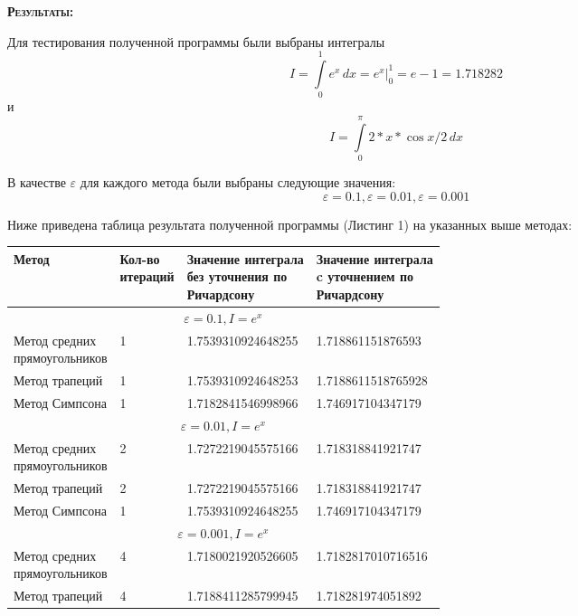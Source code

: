 \documentclass [12pt]{article}
\begin{document}
\textsc{\textbf{Результаты:}}

Для тестирования полученной программы были выбраны интегралы $$ I = \int\limits_0^1 e^x\,dx = e^x \bigg|_0^1 = e - 1 = 1.718282$$ и $$ I = \int\limits_0^\pi 2*x*\cos{x/2}\, dx$$

В качестве  $\varepsilon$ для каждого метода были выбраны следующие значения: $$\varepsilon=0.1,\varepsilon=0.01,\varepsilon=0.001$$

Ниже приведена таблица результата полученной программы (Листинг 1) на указанных выше методах:

\begin{center}
\begin{tabular}{ |l|l|l|l| }
  \hline
   Метод & \parbox[t]{2cm} {Кол-во \\ итераций} & \parbox[t]{4cm}{Значение интеграла \\ без уточнения по \\ Ричардсону} & \parbox[t]{4cm}{Значение интеграла \\ c уточнением по \\ Ричардсону} \\ \hline
   \\ \hline
  \parbox[t]{5cm} {Метод средних \\ прямоугольников } & 1 & 1.7539310924648255 & 1.718861151876593 \\ \hline
  Метод трапеций & 1 & 1.7539310924648253 & 1.7188611518765928 \\ \hline
  Метод Симпсона & 1 & 1.7182841546998966 & 1.746917104347179 \\ \hline
   \\ \hline
  \parbox[t]{5cm} {Метод средних \\ прямоугольников } & 2 & 1.7272219045575166 & 1.718318841921747 \\ \hline
  Метод трапеций & 2 & 1.7272219045575166 & 1.718318841921747 \\ \hline
  Метод Симпсона & 1 & 1.7539310924648255 & 1.746917104347179 \\ \hline
   \\ \hline
  \parbox[t]{5cm} {Метод средних \\ прямоугольников } & 4 & 1.7180021920526605 & 1.7182817010716516 \\ \hline
  Метод трапеций & 4 & 1.7188411285799945 & 1.718281974051892 \\ \hline

\end{tabular}
\end{center}
\end{document}

